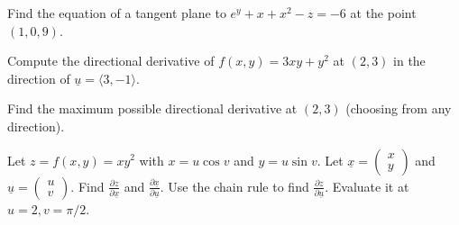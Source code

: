 \documentclass[12pt,letterpaper,noanswers]{exam}
\newcommand{\mb}[1]{\underline{#1}}
\begin{document}
 \pdfpageheight 11in 
  \pdfpagewidth 8.5in



\begin{questions}
\item Find the equation of a tangent plane to $e^y + x + x^2 - z = -6$ at the point $(1,0,9)$.

\vfill

\item 
\begin{parts}
\item Compute the directional derivative of $f(x,y) = 3xy+y^2$ at $(2,3)$ in the direction of $\mb{u} = \langle 3,-1\rangle$.
\vfill

\item Find the maximum possible directional derivative at $(2,3)$ (choosing from any direction).

\vfill
\end{parts}


\item Let $z = f(x,y) = xy^2$ with $x = u\cos v$ and $y = u\sin v$.  Let $\displaystyle\underline{x} = \left(\begin{array}{c} x\\ y\end{array}\right)$ and $\displaystyle\underline{u} = \left(\begin{array}{c} u\\ v\end{array}\right)$. Find $\displaystyle\frac{\partial z}{\partial\underline{x}}$ and $\displaystyle\frac{\partial \underline{x}}{\partial\underline{u}}$.  Use the chain rule to find $\displaystyle\frac{\partial z}{\partial\underline{u}}$.  Evaluate it at $u = 2, v = \pi/2$.

\vfill

\end{questions}
\end{document}
